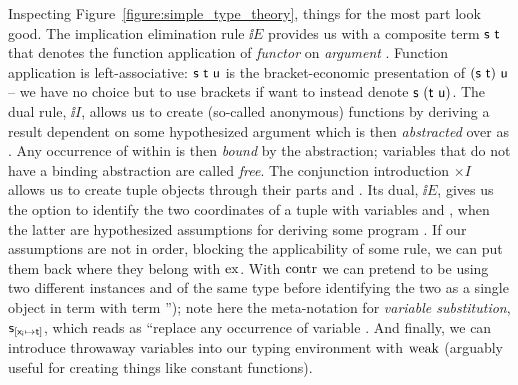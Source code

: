 Inspecting Figure~\ref{figure:simple_type_theory}, things for the most part look good.
The implication elimination rule $\ii E$ provides us with a composite term $\mathsf{s~t}$ that denotes the function application of \textit{functor}  on \textit{argument} .
Function application is left-associative: $\mathsf{s~t~u}$ is the bracket-economic presentation of $(\mathsf{s~t})~\mathsf{u}$ -- we have no choice but to use brackets if want to instead denote $\mathsf{s}~(\mathsf{t~u})$.
The dual rule, $\ii I$, allows us to create (so-called anonymous) functions by deriving a result  dependent on some hypothesized argument  which is then \textit{abstracted} over as .
Any occurrence of  within  is then \textit{bound} by the abstraction; variables that do not have a binding abstraction are called \textit{free}.
The conjunction introduction $\times I$ allows us to create tuple objects  through their parts  and .
Its dual, $\ii E$, gives us the option to identify the two coordinates of a tuple  with variables  and , when the latter are hypothesized assumptions for deriving some program .
If our assumptions are not in order, blocking the applicability of some rule, we can put them back where they belong with $\mathrm{ex}{}$.
With $\mathrm{contr}{}$ we can pretend to be using two different instances  and  of the same type before identifying the two as a single object  in term  with term '');
note here the meta-notation for \textit{variable substitution}, $\mathsf{s}_{[\mathsf{x_i} \mapsto \mathsf{t}]}$, which reads as ``replace any occurrence of variable .
And finally, we can introduce throwaway variables into our typing environment with $\mathrm{weak}{}$ (arguably useful for creating things like constant functions).

